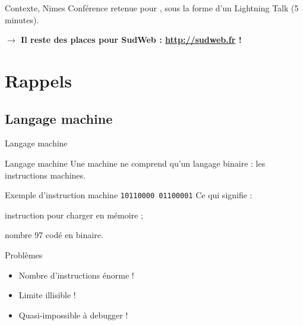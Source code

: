 \documentclass[notes]{beamer}
\begin{document}
\begin{frame}{Contexte}{\sw, Nimes}
    Conférence retenue pour \sw, sous la forme d'un \alert{Lightning Talk} (5 minutes).
    \begin{center}
    \end{center}
    \pause
    \alert{\bf $\rightarrow$ Il reste des places pour SudWeb : \url{http://sudweb.fr} !}
\end{frame}

\section{Rappels}

\subsection{Langage machine}

\begin{frame}{Langage machine}

    \begin{block}{Langage machine}
    Une machine ne comprend qu'un langage binaire : les instructions machines.
    \end{block}

    \pause

    \begin{exampleblock}{Exemple d'instruction machine}
    \verb!10110000 01100001!
    \pause
    Ce qui signifie :
    \pause
    \begin{description}[<+->]
    \item [\verb!10110000!] instruction pour charger en mémoire ;
    \item [\verb!01100001!] nombre 97 codé en binaire.
    \end{description}
    \end{exampleblock}


    \begin{alertblock}{Problèmes}
    \begin{itemize}[<+->]
    \item Nombre d'instructions énorme !
    \item Limite illisible !
    \item Quasi-impossible à debugger !
    \end{itemize}
    \end{alertblock}

\end{frame}
\end{document}
